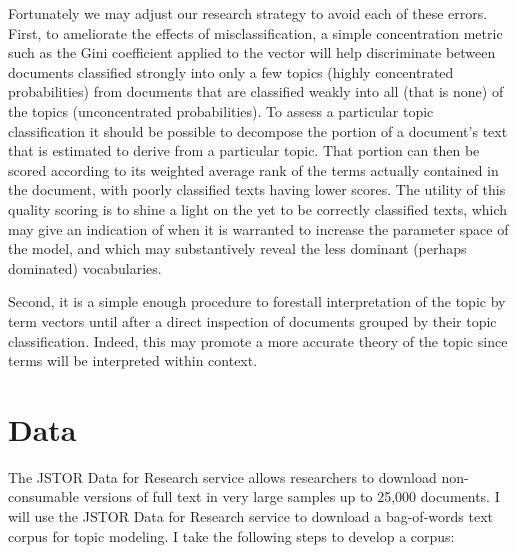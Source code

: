 \documentclass[]{book}
\theoremstyle{definition}
\theoremstyle{definition}
\theoremstyle{definition}
\theoremstyle{remark}
\begin{document}
Fortunately we may adjust our research strategy to avoid each of these
errors. First, to ameliorate the effects of misclassification, a simple
concentration metric such as the Gini coefficient applied to the vector
will help discriminate between documents classified strongly into only a
few topics (highly concentrated probabilities) from documents that are
classified weakly into all (that is none) of the topics (unconcentrated
probabilities). To assess a particular topic classification it should be
possible to decompose the portion of a document's text that is estimated
to derive from a particular topic. That portion can then be scored
according to its weighted average rank of the terms actually contained
in the document, with poorly classified texts having lower scores. The
utility of this quality scoring is to shine a light on the yet to be
correctly classified texts, which may give an indication of when it is
warranted to increase the parameter space of the model, and which may
substantively reveal the less dominant (perhaps dominated) vocabularies.

Second, it is a simple enough procedure to forestall interpretation of
the topic by term vectors until after a direct inspection of documents
grouped by their topic classification. Indeed, this may promote a more
accurate theory of the topic since terms will be interpreted within
context.

\hypertarget{data}{%
\section{Data}\label{data}}

The JSTOR Data for Research service allows researchers to download
non-consumable versions of full text in very large samples up to 25,000
documents. I will use the JSTOR Data for Research service to download a
bag-of-words text corpus for topic modeling. I take the following steps
to develop a corpus:
\end{document}
